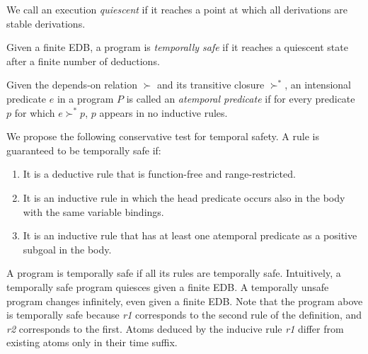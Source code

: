 
We call an execution \emph{quiescent} if it reaches a point at which all derivations are stable derivations.

\begin{definition}
Given a finite EDB, a program is \emph{temporally safe} if it reaches a quiescent state after a finite 
number of deductions.
\end{definition}

\begin{definition}
Given the depends-on relation $\succ$ and its transitive closure $\succ^{*}$, 
an intensional predicate $e$ in a program $P$ is called an \emph{atemporal predicate} 
if for every predicate $p$ for which $e \succ^{*} p$, $p$ appears in no inductive rules.
\end{definition}

We propose the following conservative test for temporal safety.  A rule is guaranteed to be temporally safe if:

\begin{enumerate}
\item It is a deductive rule that is function-free and range-restricted.
\item It is an inductive rule in which the head predicate occurs also in the body with the same variable 
bindings.
\item It is an inductive rule that has at least one atemporal predicate as a positive subgoal in the body.
\end{enumerate}


A \slang program is temporally safe if all its rules are temporally safe.
Intuitively, a temporally safe program quiesces given a finite EDB.  A
temporally unsafe program changes infinitely, even given a finite EDB.  Note
that the \slang program above is temporally safe because \emph{r1} corresponds
to the second rule of the definition, and \emph{r2} corresponds to the first.
Atoms deduced by the inducive rule \emph{r1} differ from existing atoms only in
their time suffix.


